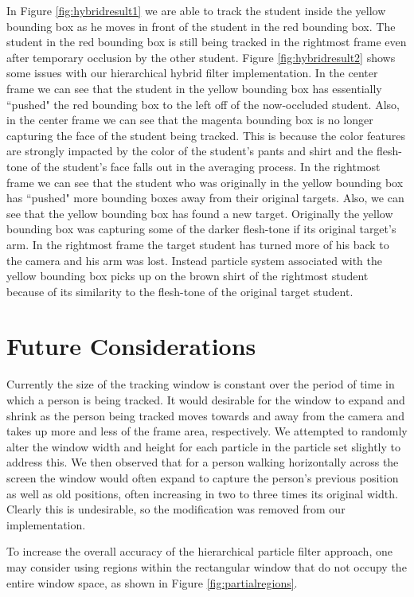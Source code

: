 \documentclass[11pt]{article}
\begin{document}
In Figure \ref{fig:hybridresult1} we are able to track the student inside the yellow bounding box as he moves in front of the student in the red bounding box. The student in the red bounding box is still being tracked in the rightmost frame even after temporary occlusion by the other student.  Figure \ref{fig:hybridresult2} shows some issues with our hierarchical hybrid filter implementation. In the center frame we can see that the student in the yellow bounding box has essentially ``pushed" the red bounding box to the left off of the now-occluded student. Also, in the center frame we can see that the magenta bounding box is no longer capturing the face of the student being tracked. This is because the color features are strongly impacted by the color of the student's pants and shirt and the flesh-tone of the student's face falls out in the averaging process. In the rightmost frame we can see that the student who was originally in the yellow bounding box has ``pushed" more bounding boxes away from their original targets. Also, we can see that the yellow bounding box has found a new target. Originally the yellow bounding box was capturing some of the darker flesh-tone if its original target's arm. In the rightmost frame the target student has turned more of his back to the camera and his arm was lost. Instead particle system associated with the yellow bounding box picks up on the brown shirt of the rightmost student because of its similarity to the flesh-tone of the original target student.


\section{Future Considerations}
\label{sec:future}

Currently the size of the tracking window is constant over the period of time in which a person is being tracked. It would desirable for the window to expand and shrink as the person being tracked moves towards and away from the camera and takes up more and less of the frame area, respectively. We attempted to randomly alter the window width and height for each particle in the particle set slightly to address this. We then observed that for a person walking horizontally across the screen the window would often expand to capture the person's previous position as well as old positions, often increasing in two to three times its original width. Clearly this is undesirable, so the modification was removed from our implementation.

To increase the overall accuracy of the hierarchical particle filter approach, one may consider using regions within the rectangular window that do not occupy the entire window space, as shown in Figure \ref{fig:partialregions}.
\end{document}
